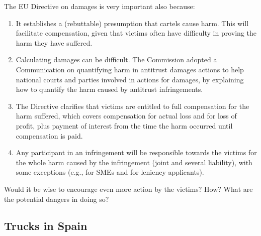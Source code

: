             The EU Directive on damages is very important also because:

            \begin{enumerate}
                \item It establishes a (rebuttable) presumption that cartels cause harm. This will facilitate compensation, given that victims often have difficulty in proving the harm they have suffered.
                \item Calculating damages can be difficult. The Commission adopted a Communication on quantifying harm in antitrust damages actions to help national courts and parties involved in actions for damages, by explaining how to quantify the harm caused by antitrust infringements.
                \item The Directive clarifies that victims are entitled to full compensation for the harm suffered, which covers compensation for actual loss and for loss of profit, plus payment of interest from the time the harm occurred until compensation is paid.
                \item Any participant in an infringement will be responsible towards the victims for the whole harm caused by the infringement (joint and several liability), with some exceptions (e.g., for SMEs and for leniency applicants).
            \end{enumerate}
            
            \noindent Would it be wise to encourage even more action by the victims? How? What are the potential dangers in doing so?

\newpage
    \subsection{Trucks in Spain}

